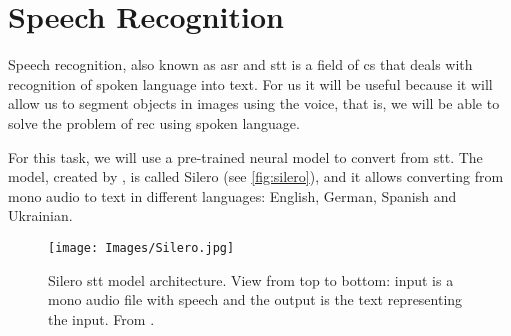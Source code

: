 \section{Speech Recognition}%
\label{sec:speech}

Speech recognition, also known as \gls{asr} and \gls{stt} is a field of
\gls{cs} that deals with recognition of spoken language into text. For us it
will be useful because it will allow us to segment objects in images using the
voice, that is, we will be able to solve the problem of \gls{rec} using spoken
language.

For this task, we will use a pre-trained neural model to convert from
\gls{stt}. The model, created by
, is called Silero (see
\vref{fig:silero}), and it allows converting from mono audio to text in
different languages: English, German, Spanish and Ukrainian.

\begin{figure}[p]
  \centering
  \texttt{[image: Images/Silero.jpg]}
  \caption[Silero  model architecture]{Silero \acf{stt} model
    architecture. View from top to bottom: input is a mono audio file with
    speech and the output is the text representing the input. From
    .}%
  \label{fig:silero}
\end{figure}
